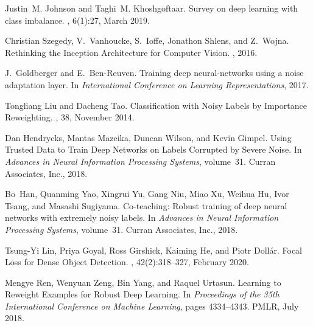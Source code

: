 \documentclass{article}
\begin{document}
\begin{thebibliography}{10}
  Justin~M. Johnson and Taghi~M. Khoshgoftaar.
  \newblock Survey on deep learning with class imbalance.
  , 6(1):27, March 2019.
  
  Christian Szegedy, V.~Vanhoucke, S.~Ioffe, Jonathon Shlens, and Z.~Wojna.
  \newblock Rethinking the {{Inception Architecture}} for {{Computer Vision}}.
  , 2016.
  
  J.~Goldberger and E.~{Ben-Reuven}.
  \newblock Training deep neural-networks using a noise adaptation layer.
  \newblock In {\em International {{Conference}} on {{Learning
    Representations}}}, 2017.
  
  Tongliang Liu and Dacheng Tao.
  \newblock Classification with {{Noisy Labels}} by {{Importance Reweighting}}.
  ,
    38, November 2014.
  
  Dan Hendrycks, Mantas Mazeika, Duncan Wilson, and Kevin Gimpel.
  \newblock Using {{Trusted Data}} to {{Train Deep Networks}} on {{Labels
    Corrupted}} by {{Severe Noise}}.
  \newblock In {\em Advances in {{Neural Information Processing Systems}}},
    volume~31. {Curran Associates, Inc.}, 2018.
  
  Bo~Han, Quanming Yao, Xingrui Yu, Gang Niu, Miao Xu, Weihua Hu, Ivor Tsang, and
    Masashi Sugiyama.
  \newblock Co-teaching: Robust training of deep neural networks with extremely
    noisy labels.
  \newblock In {\em Advances in {{Neural Information Processing Systems}}},
    volume~31. {Curran Associates, Inc.}, 2018.
  
  Tsung-Yi Lin, Priya Goyal, Ross Girshick, Kaiming He, and Piotr Doll{\'a}r.
  \newblock Focal {{Loss}} for {{Dense Object Detection}}.
  ,
    42(2):318--327, February 2020.
  
  Mengye Ren, Wenyuan Zeng, Bin Yang, and Raquel Urtasun.
  \newblock Learning to {{Reweight Examples}} for {{Robust Deep Learning}}.
  \newblock In {\em Proceedings of the 35th {{International Conference}} on
    {{Machine Learning}}}, pages 4334--4343. {PMLR}, July 2018.
  

\end{thebibliography}
\end{document}
